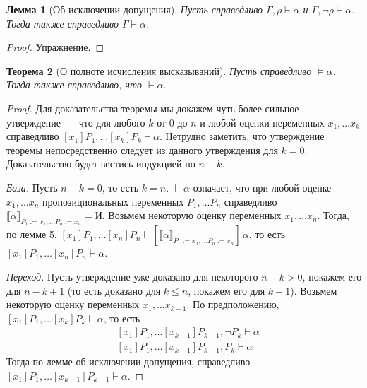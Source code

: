 \documentclass[a4paper,11pt]{article}
\newtheorem{thm}{Теорема}[section]
\newtheorem{lmm}[thm]{Лемма}
\theoremstyle{definition}
\newcommand{\sem}[2]{\llbracket #1 \rrbracket_{#2}}
\newcommand{\proves}{\vdash}
\newcommand{\True}{\text{И}}
\begin{document}
\begin{lmm}[Об исключении допущения]
Пусть справедливо $\Gamma, \rho \proves \alpha$ и $\Gamma, \neg\rho \proves
\alpha$. Тогда также справедливо $\Gamma \proves \alpha$.
\end{lmm}
\begin{proof}
Упражнение.
\end{proof}

\begin{thm}[О полноте исчисления высказываний]
Пусть справедливо $\models \alpha$. Тогда также справедливо, что $\proves
\alpha$.
\end{thm}
\begin{proof}
Для доказательства теоремы мы докажем чуть более сильное утверждение~--- что
для любого $k$ от $0$ до $n$ и любой оценки переменных $x_1, \dots x_k$
справедливо $[x_1]P_1, \dots [x_k]P_k \proves \alpha$. Нетрудно заметить, что
утверждение теоремы непосредственно следует из данного утверждения для $k = 0$.
Доказательство будет вестись индукцией по $n - k$.

\emph{База.} Пусть $n - k = 0$, то есть $k = n$. $\models \alpha$ означает, что
при любой оценке $x_1, \dots x_n$ пропозициональных переменных $P_1, \dots P_n$
справедливо $\sem{\alpha}{P_1:=x_1,\dots P_n:=x_n} = \True$. Возьмем некоторую
оценку переменных $x_1, \dots x_n$. Тогда, по лемме 5,
$[x_1]P_1, \dots [x_n]P_n \proves [\sem{\alpha}{P_1:=x_1,\dots P_n:=x_n}]\,\alpha$,
то есть $[x_1]P_1, \dots [x_n]P_n \proves \alpha$.

\emph{Переход.} Пусть утверждение уже доказано для некоторого $n - k > 0$,
покажем его для $n - k + 1$ (то есть доказано для $k \le n$, покажем его для
$k - 1$). Возьмем некоторую оценку переменных $x_1, \dots x_{k-1}$. По
предположению, $[x_1]P_1, \dots [x_k]P_k \proves \alpha$, то есть
\begin{align*}
&[x_1]P_1, \dots [x_{k-1}]P_{k-1}, \neg P_k \proves \alpha\\
&[x_1]P_1, \dots [x_{k-1}]P_{k-1}, P_k \proves \alpha
\end{align*}
Тогда по лемме об исключении допущения, справедливо $[x_1]P_1, \dots
[x_{k-1}]P_{k-1} \proves \alpha$.
\end{proof}
\end{document}
